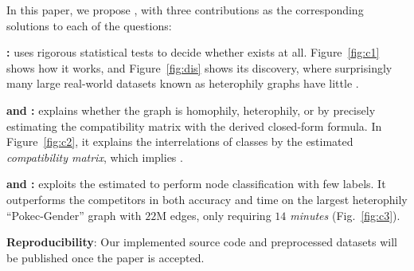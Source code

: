 In this paper, we propose \method, with three contributions as the corresponding solutions to each of the questions:

\ben
    \item {\bf \theory: \methodtest} 
    uses rigorous statistical tests to decide whether \nef exists at all.
    Figure~\ref{fig:c1} shows how it works, and Figure~\ref{fig:dis} shows its discovery, where surprisingly many large real-world datasets known as heterophily graphs have little \nef.

\item {\bf \general and \explain: \methodest} explains whether the graph is homophily, heterophily, or \xophily by precisely estimating the compatibility matrix with the derived closed-form formula.
In Figure~\ref{fig:c2}, it explains the interrelations of classes by the estimated \emph{compatibility matrix}, which implies \xophily.

\item {\bf \accurate and \scale: \methodexp} exploits the estimated \nef to perform node classification with few labels. %
It outperforms the competitors in both accuracy and time on the largest heterophily ``Pokec-Gender'' graph with $22$M edges, only requiring {\em $14$ minutes} (Fig.~\ref{fig:c3}). 
\een


{\bf Reproducibility}: Our implemented source code and preprocessed datasets will be published once the paper is accepted.

